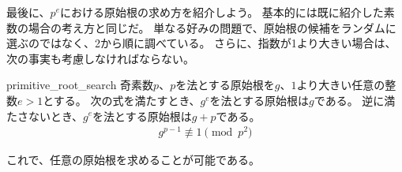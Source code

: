 最後に、$p^e$における原始根の求め方を紹介しよう。
基本的には既に紹介した素数の場合の考え方と同じだ。
単なる好みの問題で、原始根の候補をランダムに選ぶのではなく、2から順に調べている。
さらに、指数が1より大きい場合は、次の事実も考慮しなければならない。

\begin{Prop}{}{primitive_root_search}
奇素数$p$、$p$を法とする原始根を$g$、$1$より大きい任意の整数$e>1$とする。
次の式を満たすとき、$g^e$を法とする原始根は$g$である。
逆に満たさないとき、$g^e$を法とする原始根は$g+p$である。
\begin{align*}
g^{p-1} \not\equiv 1 \pmod{p^2}
\end{align*}
\end{Prop}

これで、任意の原始根を求めることが可能である。

